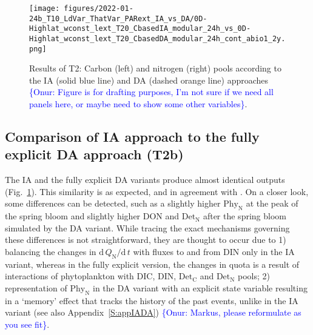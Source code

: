 \documentclass[gmd, manuscript, draft]{copernicus}
\newcommand{\onur}[1]{\textcolor{blue}{\{Onur: #1\}}}
\begin{document}
\begin{figure}[ht!]
\texttt{[image: figures/2022-01-24b\_T10\_LdVar\_ThatVar\_PARext\_IA\_vs\_DA/0D-Highlat\_wconst\_lext\_T20\_CbasedIA\_modular\_24h\_vs\_0D-Highlat\_wconst\_lext\_T20\_CbasedDA\_modular\_24h\_cont\_abio1\_2y.png]}
\caption{Results of T2: Carbon (left) and nitrogen (right) pools according to the IA (solid blue line) and DA (dashed orange line) approaches  \onur{Figure is for drafting purposes, I'm not sure if we need all panels here, or maybe need to show some other variables}.\label{f.T2res}}
\end{figure}

\subsection{Comparison of IA approach to the fully explicit DA approach (T2b)}
The IA and the fully explicit DA variants produce almost identical outputs (Fig.~\ref{f.T2res}). This similarity is as expected, and in agreement with \citet{Ward2017}. On a closer look, some differences can be detected, such as a slightly higher $\text{Phy}_{\text{N}}$ at the peak of the spring bloom and slightly higher DON and $\text{Det}_{\text{N}}$ after the spring bloom simulated by the DA variant. While tracing the exact mechanisms governing these differences is not straightforward, they are thought to occur due to 1) balancing the changes in $\text{d}\,Q_{\text{N}}/\text{d}\,t$ with fluxes to and from DIN only in the IA variant, whereas in the fully explicit version, the changes in quota is a result of interactions of phytoplankton with DIC, DIN, $\text{Det}_{\text{C}}$ and $\text{Det}_{\text{N}}$ pools; 2) representation of $\text{Phy}_{\text{N}}$ in the DA variant with an explicit state variable resulting in a `memory' effect that tracks the history of the past events, unlike in the IA variant (see also Appendix~\ref{S:appIADA}) \onur{Markus, please reformulate as you see fit}.



\end{document}
